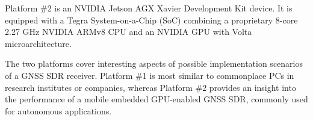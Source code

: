 \documentclass{juliacon}
\begin{document}
Platform \#2 is an NVIDIA Jetson AGX Xavier Development Kit device. It is equipped with a Tegra System-on-a-Chip (SoC) combining a proprietary 8-core 2.27 GHz NVIDIA ARMv8 CPU and an NVIDIA GPU with Volta microarchitecture. 

The two platforms cover interesting aspects of possible implementation scenarios of a GNSS SDR receiver. Platform \#1 is most similar to commonplace PCs in research institutes or companies, whereas Platform \#2 provides an insight into the performance of a mobile embedded GPU-enabled GNSS SDR, commonly used for autonomous applications.

\begin{table}[t]
\end{table}
\end{document}
